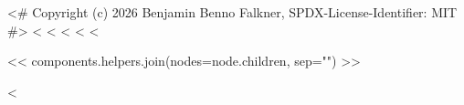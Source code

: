 <# Copyright (c) 2026 Benjamin Benno Falkner, SPDX-License-Identifier: MIT #>
<%
<%
<%
<%
<%
\begin{<< env >>}
<< components.helpers.join(nodes=node.children, sep="\n") >>
\end{<< env >>}
<%
